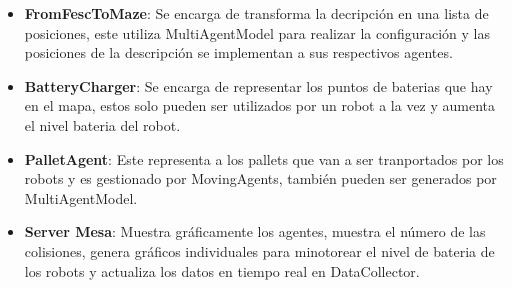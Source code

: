 \documentclass[sjournal]{IEEEtran}
\begin{document}
\begin{itemize}
\item \textbf{FromFescToMaze}: Se encarga de transforma la decripción en una lista de posiciones, este utiliza MultiAgentModel para realizar la configuración y las posiciones de la descripción se implementan a sus respectivos agentes.
\end{itemize}

\begin{itemize}
\item \textbf{BatteryCharger}: Se encarga de representar los puntos de baterias que hay en el mapa, estos solo pueden ser utilizados por un robot a la vez y aumenta el nivel bateria del robot.
\end{itemize}

\begin{itemize}
\item \textbf{PalletAgent}: Este representa a los pallets que van a ser tranportados por los robots y es gestionado por MovingAgents, también pueden ser generados por MultiAgentModel.
\end{itemize}

\begin{itemize}
\item \textbf{Server Mesa}: Muestra gráficamente los agentes, muestra el número de las colisiones, genera gráficos individuales para minotorear el nivel de bateria de los robots y actualiza los datos en tiempo real en DataCollector.
\end{itemize}
\end{document}
